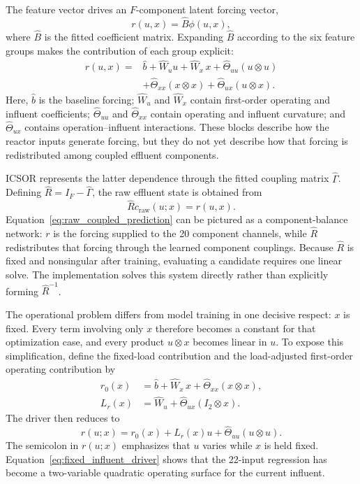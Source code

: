 \documentclass[a4paper,fleqn]{cas-sc}
\begin{document}
The feature vector drives an $F$-component latent forcing vector,
\begin{equation}
\label{eq:icsor_driver}
r(u,x)=\widehat B\phi(u,x),
\end{equation}
where $\widehat B$ is the fitted coefficient matrix. Expanding $\widehat B$ according to the six feature groups makes the contribution of each group explicit:
\begin{equation}
\label{eq:icsor_driver_blocks}
\begin{split}
r(u,x)={}&\widehat b
+\widehat W_u u
+\widehat W_x\,x
+\widehat\Theta_{uu}(u\otimes u)\\
&+\widehat\Theta_{xx}(x\otimes x)
+\widehat\Theta_{ux}(u\otimes x).
\end{split}
\end{equation}
Here, $\widehat b$ is the baseline forcing; $\widehat W_u$ and $\widehat W_x$ contain first-order operating and influent coefficients; $\widehat\Theta_{uu}$ and $\widehat\Theta_{xx}$ contain operating and influent curvature; and $\widehat\Theta_{ux}$ contains operation--influent interactions. These blocks describe how the reactor inputs generate forcing, but they do not yet describe how that forcing is redistributed among coupled effluent components.

ICSOR represents the latter dependence through the fitted coupling matrix $\widehat\Gamma$. Defining $\widehat R=I_F-\widehat\Gamma$, the raw effluent state is obtained from
\begin{equation}
\label{eq:raw_coupled_prediction}
\widehat R c_{\mathrm{raw}}(u;x)=r(u,x).
\end{equation}
Equation~\eqref{eq:raw_coupled_prediction} can be pictured as a component-balance network: $r$ is the forcing supplied to the 20 component channels, while $\widehat R$ redistributes that forcing through the learned component couplings. Because $\widehat R$ is fixed and nonsingular after training, evaluating a candidate requires one linear solve. The implementation solves this system directly rather than explicitly forming $\widehat R^{-1}$.

The operational problem differs from model training in one decisive respect: $x$ is fixed. Every term involving only $x$ therefore becomes a constant for that optimization case, and every product $u\otimes x$ becomes linear in $u$. To expose this simplification, define the fixed-load contribution and the load-adjusted first-order operating contribution by
\begin{align}
r_0(x)&=\widehat b+\widehat W_x\,x
+\widehat\Theta_{xx}(x\otimes x),\nonumber\\
L_r(x)&=\widehat W_u
+\widehat\Theta_{ux}(I_2\otimes x).
\label{eq:fixed_influent_blocks}
\end{align}
The driver then reduces to
\begin{equation}
\label{eq:fixed_influent_driver}
r(u;x)=r_0(x)+L_r(x)u+\widehat\Theta_{uu}(u\otimes u).
\end{equation}
The semicolon in $r(u;x)$ emphasizes that $u$ varies while $x$ is held fixed. Equation~\eqref{eq:fixed_influent_driver} shows that the 22-input regression has become a two-variable quadratic operating surface for the current influent.
\end{document}
